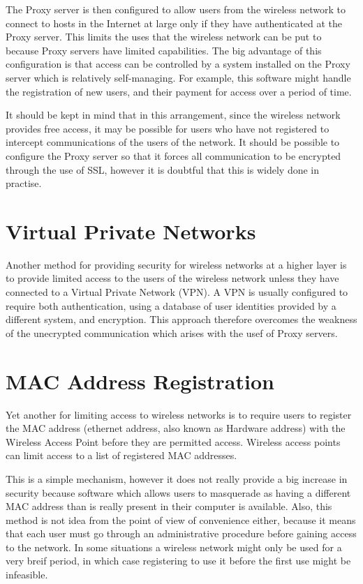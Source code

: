 The Proxy server is then configured to allow users from the wireless network to connect to
hosts in the Internet at large only if they have authenticated at the Proxy server. This limits the
uses that the wireless network can be put to because Proxy servers have limited capabilities.
The big advantage of this configuration is that access can be controlled by a system installed
on the Proxy server which is relatively self-managing. For example, this software might
handle the registration of new users, and their payment for access over a period of time.

It should be kept in mind that in this arrangement, since the wireless network provides free
access, it may be possible for users who have not registered to intercept communications of
the users of the network. It should be possible to configure the Proxy server so that it forces
all communication to be encrypted through the use of SSL, however it is doubtful that this is
widely done in practise.

\section{Virtual Private Networks}

Another method for providing security for wireless networks at a higher layer is to provide
limited access to the users of the wireless network unless they have connected to a Virtual
Private Network (VPN). A VPN is usually configured to require both authentication, using
a database of user identities provided by a different system, and encryption. This approach
therefore overcomes the weakness of the unecrypted communication which arises with the
usef of Proxy servers.

\section{MAC Address Registration}

Yet another for limiting access to wireless networks is to require users to register the MAC
address (ethernet address, also known as Hardware address) with the Wireless Access Point
before they are permitted access. Wireless access points can limit access to a list of registered
MAC addresses.

This is a simple mechanism, however it does not really provide a big increase in security
because software which allows users to masquerade as having a different MAC address than
is really present in their computer is available. Also, this method is not idea from the point of
view of convenience either, because it means that each user must go through an administrative
procedure before gaining access to the network. In some situations a wireless network might
only be used for a very breif period, in which case registering to use it before the first use
might be infeasible.

